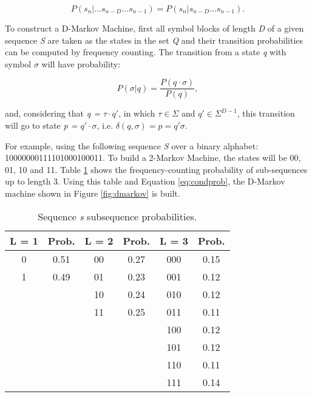 {\[
P(s_n|\ldots s_{n-D}\ldots s_{n-1}) = P(s_n|s_{n-D}\ldots s_{n-1}).
\]

To construct a D-Markov Machine, first all symbol blocks of length \textit{D} of a given sequence \textit{S} are taken as the states in the set \textit{Q} and their transition probabilities can be computed by frequency counting. The transition from a state \textit{q} with symbol $\sigma$ will have probability:

\begin{equation}\label{eq:condprob}
P(\sigma | q) = \frac{P(q\cdot\sigma)}{P(q)},
\end{equation}

\noindent and, considering that \textit{q = \textit{$\tau\cdot q'$}}, in which $\tau\in\Sigma$ and $q'\in\Sigma^{D-1}$, this transition will go to state \textit{p = $q'\cdot\sigma$}, i.e. $\delta(q,\sigma) = p = q'\sigma$.

For example, using the following sequence \textit{S} over a binary alphabet: 10000000111101000100011.
To build a 2-Markov Machine, the states will be 00, 01, 10 and 11. Table \ref{tab:subseq} shows the frequency-counting probability of sub-sequences up to length 3. Using this table and Equation \ref{eq:condprob}, the D-Markov machine shown in Figure \ref{fig:dmarkov} is built.

\begin{table}
\centering
\begin{tabular}{|c|c|c|c|c|c|}
\hline
\textbf{L = 1} & \textbf{Prob.} & \textbf{L = 2} & \textbf{Prob.} & \textbf{L = 3} & \textbf{Prob.} \\
\hline
0 & 0.51 & 00 & 0.27 & 000 & 0.15\\
1 & 0.49 & 01 & 0.23 & 001 & 0.12\\
  &      & 10 & 0.24 & 010 & 0.12\\
  &      & 11 & 0.25 & 011 & 0.11\\
  &	     &    &      & 100 & 0.12\\
  &      &    &      & 101 & 0.12\\
  &      &    &      & 110 & 0.11\\
  &      &    &      & 111 & 0.14\\
\hline
\end{tabular}\caption{Sequence \textit{s} subsequence probabilities. \label{tab:subseq}}
\end{table}

}
